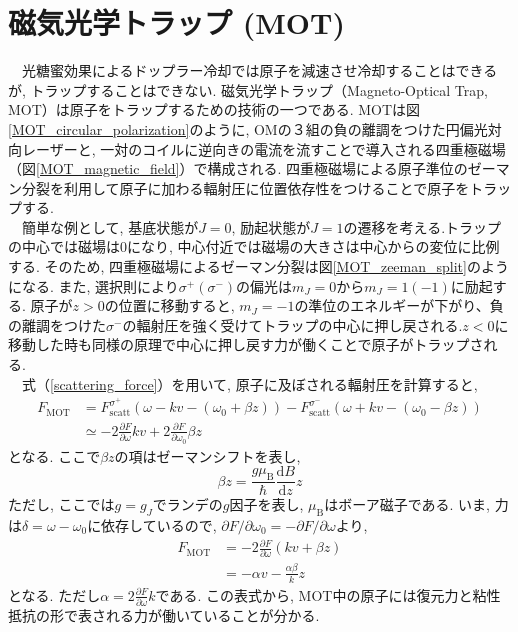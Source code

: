 \documentclass[uplatex, dvipdfmx, a4paper, report, papersize, 11pt]{jsbook}
\begin{document}
\section{磁気光学トラップ (MOT)}
　光糖蜜効果によるドップラー冷却では原子を減速させ冷却することはできるが, トラップすることはできない. 磁気光学トラップ（Magneto-Optical Trap,  MOT）は原子をトラップするための技術の一つである. MOTは図\ref{MOT_circular_polarization}のように, OMの３組の負の離調をつけた円偏光対向レーザーと, 一対のコイルに逆向きの電流を流すことで導入される四重極磁場（図\ref{MOT_magnetic_field}）で構成される. 四重極磁場による原子準位のゼーマン分裂を利用して原子に加わる輻射圧に位置依存性をつけることで原子をトラップする.\\
　簡単な例として, 基底状態が$J = 0$, 励起状態が$J = 1$の遷移を考える.トラップの中心では磁場は$0$になり, 中心付近では磁場の大きさは中心からの変位に比例する. そのため, 四重極磁場によるゼーマン分裂は図\ref{MOT_zeeman_split}のようになる. また, 選択則により$\sigma^{+}(\sigma^{-})$の偏光は$m_J = 0$から$m_J = 1 (-1)$に励起する. 原子が$z > 0$の位置に移動すると, $m_J = -1$の準位のエネルギーが下がり、負の離調をつけた$\sigma^-$の輻射圧を強く受けてトラップの中心に押し戻される.$z < 0$に移動した時も同様の原理で中心に押し戻す力が働くことで原子がトラップされる.\\
 　式（\ref{scattering_force}）を用いて, 原子に及ぼされる輻射圧を計算すると,
\begin{equation}
  \begin{aligned}
     F _ { \mathrm { MOT } } & = F _ { \mathrm { scatt } } ^ { \sigma ^ { + } } \left( \omega - k v - \left( \omega _ { 0 } + \beta z \right) \right) - F _ { \mathrm { scatt } } ^ { \sigma ^ { - } } \left( \omega + k v - \left( \omega _ { 0 } - \beta z \right) \right) \\ & \simeq - 2 \frac { \partial F } { \partial \omega } k v + 2 \frac { \partial F } { \partial \omega _ { 0 } } \beta z
  \end{aligned}
\end{equation}
となる. ここで$\beta z$の項はゼーマンシフトを表し,
\begin{equation}
  \beta z = \frac { g \mu _ { \mathrm { B } } } { \hbar } \frac { \mathrm { d } B } { \mathrm { d } z } z
\end{equation}
ただし, ここでは$g = g _ { J }$でランデの$g$因子を表し, $\mu _ { \mathrm { B }}$はボーア磁子である. いま, 力は$\delta = \omega - \omega _ { 0 }$に依存しているので, $\partial F / \partial \omega _ { 0 } = - \partial F / \partial \omega$より,
\begin{equation}
  \begin{aligned} F _ { \mathrm { MOT } } & = - 2 \frac { \partial F } { \partial \omega } ( k v + \beta z ) \\ & = - \alpha v - \frac { \alpha \beta } { k } z \end{aligned}
\end{equation}
となる. ただし$\alpha = 2\frac{\partial F}{\partial \omega} k$である. この表式から, MOT中の原子には復元力と粘性抵抗の形で表される力が働いていることが分かる.
\newpage
\end{document}
